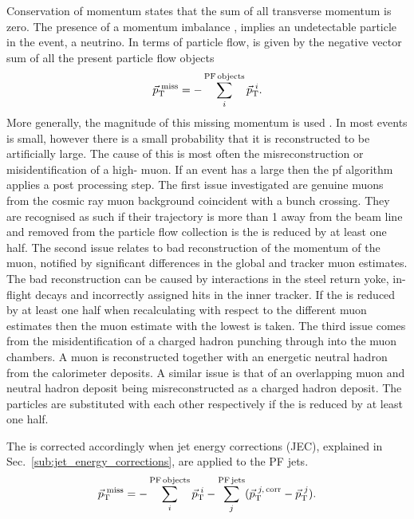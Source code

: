 Conservation of momentum states that the sum of all transverse momentum is zero.
The presence of a momentum imbalance \ptmissvec{}, implies an undetectable particle in the event, \eg{} a neutrino.
In terms of particle flow, \ptmissvec{} is given by the negative vector sum of all the present particle flow objects
\begin{equation*}
	{\vec{p}_{\mathrm{T}}}^{\,\,\mathrm{miss}} = - \sum_{i}^{\mathrm{PF\,objects}} \vec{p}_{\mathrm{T}}^{\,\,i}.
\end{equation*}
More generally, the magnitude of this missing momentum is used \ptmiss{}. 
In most events \ptmiss{} is small, however there is a small probability that it is reconstructed to be artificially large.
The cause of this is most often the misreconstruction or misidentification of a high-\pt{} muon.
If an event has a large \ptmiss{} then the \acrshort{pf} algorithm applies a post processing step.
The first issue investigated are genuine muons from the cosmic ray muon background coincident with a bunch crossing.
They are recognised as such if their trajectory is more than 1\cm{} away from the beam line and removed from the particle flow collection is the \ptmiss{} is reduced by at least one half.
The second issue relates to bad reconstruction of the momentum of the muon, notified by significant differences in the global and tracker muon \pt{} estimates.
The bad reconstruction can be caused by interactions in the steel return yoke, in-flight decays and incorrectly assigned hits in the inner tracker.
If the \ptmiss{} is reduced by at least one half when recalculating with respect to the different muon \pt{} estimates then the muon estimate with the lowest \ptmiss{} is taken.
The third issue comes from the misidentification of a charged hadron punching through into the muon chambers.
A muon is reconstructed together with an energetic neutral hadron from the calorimeter deposits.
A similar issue is that of an overlapping muon and neutral hadron deposit being misreconstructed as a charged hadron deposit.
The particles are substituted with each other respectively if the \ptmiss{} is reduced by at least one half.

The \ptmiss{} is corrected accordingly when jet energy corrections (JEC), explained in Sec.~\ref{sub:jet_energy_corrections}, are applied to the PF jets.
\begin{equation*}
		{\vec{p}_{\mathrm{T}}}^{\,\,\mathrm{miss}} = - \sum_{i}^{\mathrm{PF\,objects}}{\vec{p}_{\mathrm{T}}^{\,\,i}} - \sum_{j}^{\mathrm{PF\,jets}}({\vec{p}_{\mathrm{T}}^{\,\,j,\,\mathrm{corr}}-\vec{p}_{\mathrm{T}}^{\,\,j})}.
\end{equation*}



